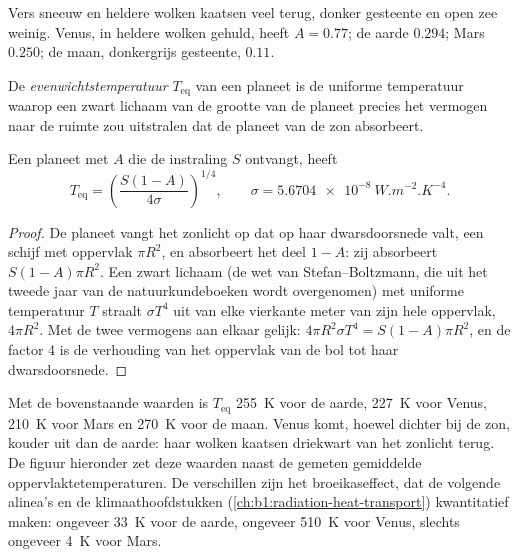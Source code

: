 Vers sneeuw en heldere wolken kaatsen veel terug, donker gesteente en open zee weinig. Venus, in heldere
wolken gehuld, heeft $A = 0.77$; de aarde $0.294$; Mars $0.250$; de maan, donkergrijs gesteente, $0.11$.

\begin{definition}[Evenwichtstemperatuur]\label{def:b1:comparative-planetology:equilibrium-temperature}
De \emph{evenwichtstemperatuur} $T_\mathrm{eq}$ van een planeet is de
uniforme temperatuur waarop een zwart lichaam van de grootte van de planeet precies het vermogen naar de
ruimte zou uitstralen dat de planeet van de zon absorbeert.
\end{definition}

\begin{proposition}[Evenwichtstemperatuur]\label{prop:b1:comparative-planetology:teq}
Een planeet met  $A$ die de instraling $S$ ontvangt, heeft
\[
  T_\mathrm{eq} = \left(\frac{S(1 - A)}{4\sigma}\right)^{1/4},
  \qquad \sigma = \qty{5.6704e-8}{W.m^{-2}.K^{-4}} .
\]
\end{proposition}

\begin{proof}
De planeet vangt het zonlicht op dat op haar dwarsdoorsnede valt, een schijf met oppervlak $\pi R^2$,
en absorbeert het deel $1 - A$: zij absorbeert $S(1 - A)\pi
R^2$. Een zwart lichaam (de wet van
Stefan--Boltzmann, die uit het tweede jaar van de natuurkundeboeken wordt overgenomen) met uniforme
temperatuur $T$ straalt $\sigma T^4$ uit van elke vierkante meter van zijn hele oppervlak, $4\pi R^2$.
Met de twee vermogens aan elkaar gelijk: $4\pi R^2\sigma T^4 = S(1 - A)\pi R^2$, en de factor 4 is de
verhouding van het oppervlak van de bol tot haar dwarsdoorsnede.
\end{proof}

Met de bovenstaande waarden is $T_\mathrm{eq}$ \qty{255}{K} voor de aarde, \qty{227}{K} voor Venus,
\qty{210}{K} voor Mars en \qty{270}{K} voor de maan. Venus komt, hoewel dichter bij de zon, kouder
uit dan de aarde: haar wolken kaatsen driekwart van het zonlicht terug. De figuur hieronder zet deze
waarden naast de gemeten gemiddelde oppervlaktetemperaturen. De verschillen zijn het broeikaseffect,
dat de volgende alinea's en de klimaathoofdstukken (\cref{ch:b1:radiation-heat-transport}) kwantitatief
maken: ongeveer \qty{33}{K} voor de aarde, ongeveer \qty{510}{K} voor Venus, slechts ongeveer
\qty{4}{K} voor Mars.

